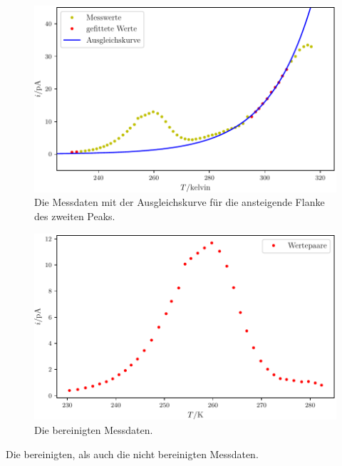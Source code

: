 \begin{figure}
	\centering
	\includegraphics[width=\linewidth-60pt,height=\textheight-60pt,keepaspectratio]{content/images/plot2exp.pdf}
	\caption{Die Messdaten mit der Ausgleichskurve für die ansteigende Flanke des zweiten Peaks.}
	\label{fig:plot2exp}
\end{figure}

\begin{figure}
	\centering
	\includegraphics[width=\linewidth-60pt,height=\textheight-60pt,keepaspectratio]{content/images/bereinigt2.pdf}
	\caption{Die bereinigten Messdaten.}
	\label{fig:bereinigt2}
\end{figure}

\begin{table}
\caption{Die bereinigten, als auch die nicht bereinigten Messdaten.}
\begin{minipage}[t]{0.5\textwidth}
	\centering
	
\end{minipage}
\begin{minipage}[t]{0.65\textwidth}
	\centering
	
\end{minipage}
\label{tab:data2}
\end{table}

